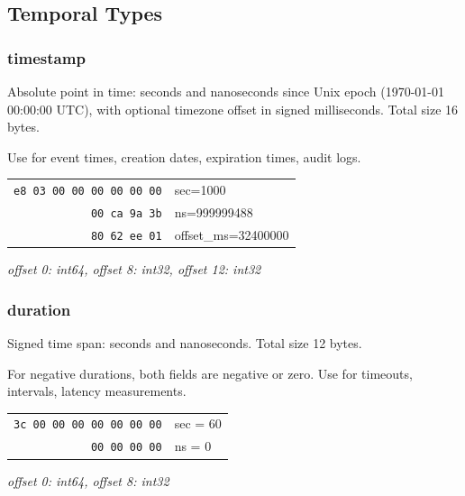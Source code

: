 \documentclass[10pt,onecolumn]{article}
\begin{document}
\subsection{Temporal Types}

\begin{minipage}{\textwidth}
\subsubsection{timestamp}

\begin{minipage}[t]{0.50\textwidth}
\raggedright
Absolute point in time: seconds and nanoseconds since Unix epoch (1970-01-01 00:00:00 UTC), with optional timezone offset in signed milliseconds. Total size 16 bytes.

Use for event times, creation dates, expiration times, audit logs.
\end{minipage}\hfill
\begin{minipage}[t]{0.46\textwidth}
\small
\begin{tabular}[t]{@{}r@{\,}l@{}}
\texttt{e8 03 00 00 00 00 00 00} & sec=1000 \\
\texttt{00 ca 9a 3b} & ns=999999488 \\
\texttt{80 62 ee 01} & offset\_ms=32400000 \\
\end{tabular}

\vspace{4pt}
\textit{offset 0: int64, offset 8: int32, offset 12: int32}
\end{minipage}

\vspace{10pt}
\subsubsection{duration}

\begin{minipage}[t]{0.52\textwidth}
Signed time span: seconds and nanoseconds. Total size 12 bytes.

For negative durations, both fields are negative or zero. Use for timeouts, intervals, latency measurements.
\end{minipage}\hfill
\begin{minipage}[t]{0.44\textwidth}
\small
\begin{tabular}[t]{@{}r@{ }l@{}}
\texttt{3c 00 00 00 00 00 00 00} & sec = 60 \\
\texttt{00 00 00 00} & ns = 0 \\
\end{tabular}

\vspace{4pt}
\textit{offset 0: int64, offset 8: int32}
\end{minipage}
\end{minipage}
\end{document}
